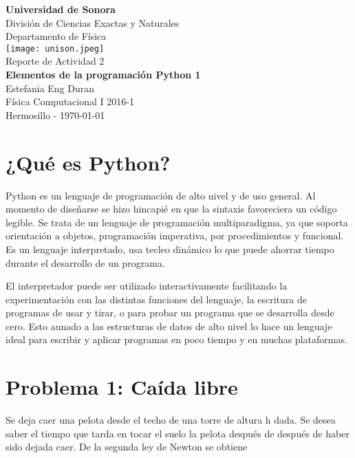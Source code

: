 \documentclass[12pt,spanish]{article}
\begin{document}
\setlength{\unitlength}{1 cm}
\thispagestyle{empty}

\begin{center}
  \textbf{\Huge Universidad de Sonora}\\[0.5cm]
  {\LARGE División de Ciencias Exactas y Naturales}\\[0.5cm]
  {\LARGE Departamento de Física}\\[1.25cm]
    \texttt{[image: unison.jpeg]}\\[0.8cm]
     \vfill
  {\Large Reporte de Actividad 2}\\[2.1cm]
  {\Large \textbf{Elementos de la programación Python 1}}\\[3.0cm]
  {\Large Estefania Eng Duran}\\[2.1cm]
  Física Computacional I 2016-1\\[0.5cm]
  Hermosillo - \today
\end{center}

\section*{¿Qué es Python?}

Python es un lenguaje de programación de alto nivel y de uso general. Al momento de diseñarse se hizo hincapié en que la sintaxis favoreciera un código legible. Se trata de un lenguaje de programación multiparadigma, ya que soporta orientación a objetos, programación imperativa, por procedimientos y funcional. Es un lenguaje interpretado, usa tecleo dinámico lo que puede ahorrar  tiempo durante el desarrollo de un programa.

El interpretador puede ser utilizado interactivamente facilitando la experimentación con las distintas funciones del lenguaje, la escritura de programas de usar y tirar, o para probar un programa que se desarrolla desde cero. Esto aunado a las estructuras de datos de alto nivel lo hace un lenguaje ideal para escribir y aplicar programas en poco tiempo y en muchas plataformas. 

\section*{Problema 1: Caída libre}

Se deja caer una pelota desde el techo de una torre de altura h dada. Se desea saber el tiempo que tarda en tocar el suelo la pelota después de después de haber sido dejada caer. De la segunda ley de Newton se obtiene
\end{document}
